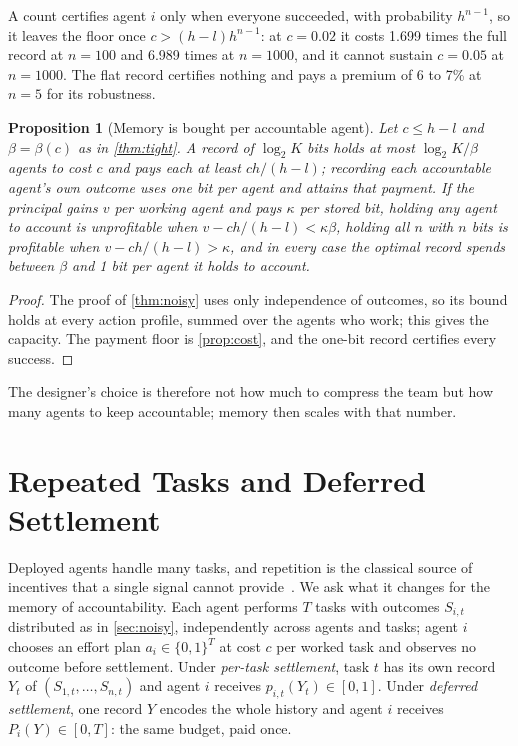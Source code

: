 \documentclass[sigconf,anonymous,acmthm=false]{acmart}
\theoremstyle{acmplain}
\newtheorem{proposition}{Proposition}
\theoremstyle{acmdefinition}
\newcommand{\cube}{\{0,1\}}
\begin{document}
A count certifies agent $i$ only when everyone succeeded, with probability $h^{n-1}$, so it
leaves the floor once $c>(h-l)h^{n-1}$: at $c=0.02$ it costs 1.699 times the full record at
$n=100$ and 6.989 times at $n=1000$, and it cannot sustain $c=0.05$ at $n=1000$. The flat
record certifies nothing and pays a premium of 6 to 7\% at $n=5$ for its robustness.

\begin{proposition}[Memory is bought per accountable agent]\label{prop:designer}
Let $c\le h-l$ and $\beta=\beta(c)$ as in \cref{thm:tight}. A record of $\log_2K$
bits holds at most $\log_2K/\beta$ agents to cost $c$ and pays each at least $ch/(h-l)$;
recording each accountable agent's own outcome uses one bit per agent and attains that
payment. If the principal gains $v$ per working agent and pays $\kappa$ per stored bit,
holding any agent to account is unprofitable when $v-ch/(h-l)<\kappa\beta$, holding all $n$
with $n$ bits is profitable when $v-ch/(h-l)>\kappa$, and in every case the optimal record
spends between $\beta$ and 1 bit per agent it holds to account.
\end{proposition}
\begin{proof}
The proof of \cref{thm:noisy} uses only independence of outcomes, so its bound holds at every
action profile, summed over the agents who work; this gives the capacity. The payment floor
is \cref{prop:cost}, and the one-bit record certifies every success.
\end{proof}

The designer's choice is therefore not how much to compress the team but how many agents to
keep accountable; memory then scales with that number.

\section{Repeated Tasks and Deferred Settlement}\label{sec:repeated}

Deployed agents handle many tasks, and repetition is the classical source of incentives that
a single signal cannot provide~\cite{radner1985repeated,jacksonsonnenschein2007}. We ask what
it changes for the memory of accountability. Each agent performs $T$ tasks with outcomes
$S_{i,t}$ distributed as in \cref{sec:noisy}, independently across agents and tasks; agent $i$
chooses an effort plan $a_i\in\cube^T$ at cost $c$ per worked task and observes no outcome
before settlement. Under \emph{per-task settlement}, task $t$ has its own record $Y_t$ of
$(S_{1,t},\dots,S_{n,t})$ and agent $i$ receives $p_{i,t}(Y_t)\in[0,1]$. Under \emph{deferred
settlement}, one record $Y$ encodes the whole history and agent $i$ receives
$P_i(Y)\in[0,T]$: the same budget, paid once.
\end{document}
